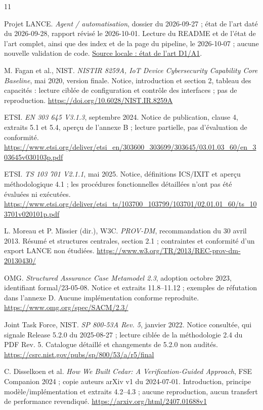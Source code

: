 \documentclass[11pt,a4paper]{article}
\begin{document}
\newpage
\begin{thebibliography}{11}
\small
{}
Projet LANCE. \emph{Agent / automatisation}, dossier du 2026-09-27 ; état de l'art daté du 2026-09-28, rapport révisé le 2026-10-01. Lecture du README et de l'état de l'art complet, ainsi que des index et de la page du pipeline, le 2026-10-07 ; aucune nouvelle validation de code.
\href{../2026-09-27-agent-vs-automation/state-of-the-art.md}{Source locale : état de l'art D1/A1}.

M. Fagan et al., NIST. \emph{NISTIR 8259A, IoT Device Cybersecurity Capability Core Baseline}, mai 2020, version finale. Notice, introduction et section 2, tableau des capacités : lecture ciblée de configuration et contrôle des interfaces ; pas de reproduction.
\url{https://doi.org/10.6028/NIST.IR.8259A}

ETSI. \emph{EN 303 645 V3.1.3}, septembre 2024. Notice de publication, clause 4, extraits 5.1 et 5.4, aperçu de l'annexe B ; lecture partielle, pas d'évaluation de conformité.
\url{https://www.etsi.org/deliver/etsi_en/303600_303699/303645/03.01.03_60/en_303645v030103p.pdf}

ETSI. \emph{TS 103 701 V2.1.1}, mai 2025. Notice, définitions ICS/IXIT et aperçu méthodologique 4.1 ; les procédures fonctionnelles détaillées n'ont pas été évaluées ni exécutées.
\url{https://www.etsi.org/deliver/etsi_ts/103700_103799/103701/02.01.01_60/ts_103701v020101p.pdf}

L. Moreau et P. Missier (dir.), W3C. \emph{PROV-DM}, recommandation du 30 avril 2013. Résumé et structures centrales, section 2.1 ; contraintes et conformité d'un export LANCE non étudiées.
\url{https://www.w3.org/TR/2013/REC-prov-dm-20130430/}

OMG. \emph{Structured Assurance Case Metamodel 2.3}, adoption octobre 2023, identifiant formal/23-05-08. Notice et extraits 11.8--11.12 ; exemples de réfutation dans l'annexe D. Aucune implémentation conforme reproduite.
\url{https://www.omg.org/spec/SACM/2.3/}

Joint Task Force, NIST. \emph{SP 800-53A Rev. 5}, janvier 2022. Notice consultée, qui signale Release 5.2.0 du 2025-08-27 ; lecture ciblée de la méthodologie 2.4 du PDF Rev. 5. Catalogue détaillé et changements de 5.2.0 non audités.
\url{https://csrc.nist.gov/pubs/sp/800/53/a/r5/final}

C. Disselkoen et al. \emph{How We Built Cedar: A Verification-Guided Approach}, FSE Companion 2024 ; copie auteurs arXiv v1 du 2024-07-01. Introduction, principe modèle/implémentation et extraits 4.2--4.3 ; aucune reproduction, aucun transfert de performance revendiqué.
\url{https://arxiv.org/html/2407.01688v1}


\end{thebibliography}
\end{document}
